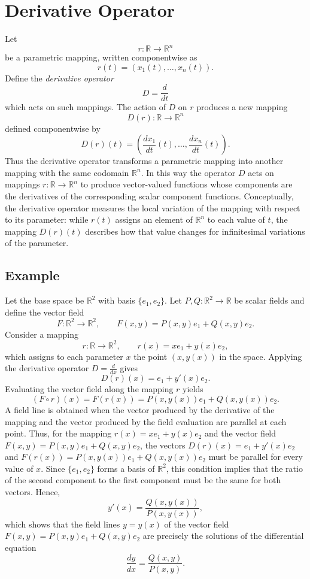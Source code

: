 \documentclass{article}
\begin{document}
	\section{Derivative Operator}
	
	Let 
	\[
	r:\mathbb{R}\to\mathbb{R}^n
	\]
	be a parametric mapping, written componentwise as
	\[
	r(t)=(x_1(t),\dots,x_n(t)).
	\]
	Define the \emph{derivative operator}
	\[
	D=\frac{d}{dt}
	\]
	which acts on such mappings. The action of $D$ on $r$ produces a new mapping
	\[
	D(r):\mathbb{R}\to\mathbb{R}^n
	\]
	defined componentwise by
	\[
	D(r)(t)=\left(\frac{dx_1}{dt}(t),\dots,\frac{dx_n}{dt}(t)\right).
	\]
	Thus the derivative operator transforms a parametric mapping into another mapping with the same codomain $\mathbb{R}^n$. In this way the operator $D$ acts on mappings $r:\mathbb{R}\to\mathbb{R}^n$ to produce vector-valued functions whose components are the derivatives of the corresponding scalar component functions. Conceptually, the derivative operator measures the local variation of the mapping with respect to its parameter: while $r(t)$ assigns an element of $\mathbb{R}^n$ to each value of $t$, the mapping $D(r)(t)$ describes how that value changes for infinitesimal variations of the parameter.
	
	\subsection{Example}
	
	Let the base space be $\mathbb{R}^2$ with basis $\{e_1,e_2\}$. Let $P,Q:\mathbb{R}^2\to\mathbb{R}$ be scalar fields and define the vector field
	\[
	F:\mathbb{R}^2\to\mathbb{R}^2, \qquad F(x,y)=P(x,y)e_1+Q(x,y)e_2.
	\]
	Consider a mapping
	\[
	r:\mathbb{R}\to\mathbb{R}^2, \qquad r(x)=xe_1+y(x)e_2,
	\]
	which assigns to each parameter $x$ the point $(x,y(x))$ in the space. Applying the derivative operator $D=\frac{d}{dx}$ gives
	\[
	D(r)(x)=e_1+y'(x)e_2.
	\]
	Evaluating the vector field along the mapping $r$ yields
	\[
	(F\circ r)(x)=F(r(x))=P(x,y(x))e_1+Q(x,y(x))e_2.
	\]
    A field line is obtained when the vector produced by the derivative of the mapping and the vector produced by the field evaluation are parallel at each point. Thus, for the mapping $r(x)=xe_1+y(x)e_2$ and the vector field $F(x,y)=P(x,y)e_1+Q(x,y)e_2$, the vectors $D(r)(x)=e_1+y'(x)e_2$ and $F(r(x))=P(x,y(x))e_1+Q(x,y(x))e_2$ must be parallel for every value of $x$. Since $\{e_1,e_2\}$ forms a basis of $\mathbb{R}^2$, this condition implies that the ratio of the second component to the first component must be the same for both vectors. Hence,
    \[
    y'(x)=\frac{Q(x,y(x))}{P(x,y(x))},
    \]
    which shows that the field lines $y=y(x)$ of the vector field $F(x,y)=P(x,y)e_1+Q(x,y)e_2$ are precisely the solutions of the differential equation
    \[
    \frac{dy}{dx}=\frac{Q(x,y)}{P(x,y)}.
    \]
    
\end{document}
